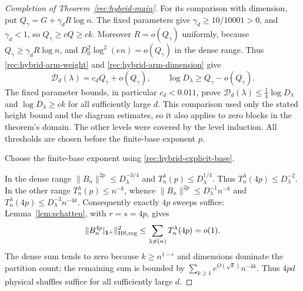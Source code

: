 \begin{proof}[Completion of Theorem~\ref{rec:hybrid-main}]
For its comparison with dimension, put
$Q_\gamma=G+\gamma_dR\log n$. The fixed parameters give
$\gamma_d\ge10/10001>0$, and $\gamma_d<1$, so
$Q_\gamma\ge cQ\ge ck$.
Moreover $R=o(Q_\gamma)$ uniformly, because
$Q_\gamma\ge\gamma_dR\log n$, and
$D_0^2\log^2(en)=o(Q_\gamma)$ in the dense range. Thus
\eqref{rec:hybrid-arm-weight} and
\eqref{rec:hybrid-arm-dimension} give
\[
 \mathcal D_d(\lambda)=c_dQ_\gamma+o(Q_\gamma),
 \qquad
 \log D_\lambda\ge Q_\gamma-o(Q_\gamma).
\]
The fixed parameter bounds, in particular $c_d<0.011$, prove
$\mathcal D_d(\lambda)\le\frac14\log D_\lambda$ and
$\log D_\lambda\ge ck$ for all sufficiently large $d$.  This
comparison used only the stated height bound and the diagram estimates,
so it also applies to zero blocks in the theorem's domain.
The other levels were covered by the level induction. All thresholds
are chosen before the finite-base exponent $p$.

Choose the finite-base exponent using \eqref{rec:hybrid-explicit-base}.

In the dense range $\|B_n\|^{2p}\le D_\lambda^{-3/4}$ and
$T_n^\lambda(p)\le D_\lambda^{1/4}$.  Thus
$T_n^\lambda(4p)\le D_\lambda^{-2}$.
In the other range $T_n^\lambda(p)\le n^{-k}$, whence
$\|B_n\|^{2p}\le D_\lambda^{-1}n^{-k}$ and
$T_n^\lambda(4p)\le D_\lambda^{-3}n^{-4k}$.
Consequently exactly $4p$ sweeps suffice:
Lemma~\ref{lem:schatten}, with $r=s=4p$, gives
\begin{equation}\label{rec:hybrid-exact-completion}
 \|B_n^{4p}|_{\mathbf1^\perp}\|_{\mathrm{HS},\mathrm{reg}}^2
 \le\sum_{\lambda\ne(n)}T_n^\lambda(4p)=o(1).
\end{equation}
The dense sum tends to zero because $k\ge n^{1-\epsilon}$ and
dimensions dominate the partition count; the remaining sum is
bounded by $\sum_{k\ge1}e^{O(\sqrt k)}n^{-4k}$.
Thus $4pd$ physical shuffles suffice for all sufficiently large $d$.
\end{proof}
